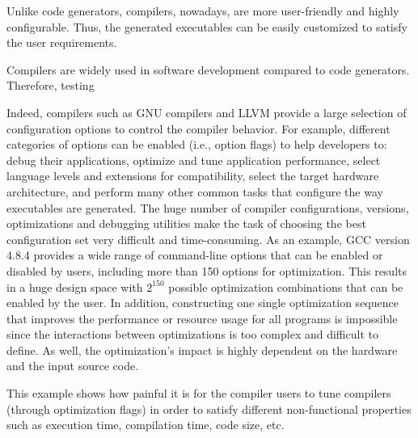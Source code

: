 Unlike code generators, compilers, nowadays, are more user-friendly and highly configurable\cite{fursin2008milepost}. Thus, the generated executables can be easily customized to satisfy the user requirements. 

Compilers are widely used in software development compared to code generators. Therefore, testing 

Indeed, compilers such as GNU compilers and LLVM provide a large selection of configuration options to control the compiler behavior. For example, different categories of options can be enabled (i.e., option flags) to help developers to: debug their applications, optimize and tune application performance, select language levels and extensions for compatibility, select the target hardware architecture, and perform many other common tasks that configure the way executables are generated.
The huge number of compiler configurations, versions, optimizations and debugging utilities make the task of choosing the best configuration set very difficult and time-consuming. As an example, GCC version 4.8.4 provides a wide range of command-line options that can be enabled or disabled by users, including more than 150 options for optimization. This results in a huge design space with $2^{150}$ possible optimization combinations that can be enabled by the user. In addition, constructing one single optimization sequence that improves the performance or resource usage for all programs is impossible since the interactions between optimizations is too complex and difficult to define. As well, the optimization's impact is highly dependent on the hardware and the input source code.


This example shows how painful it is for the compiler users to tune compilers (through optimization flags) in order to satisfy different non-functional properties such as execution time, compilation time, code size, etc.


